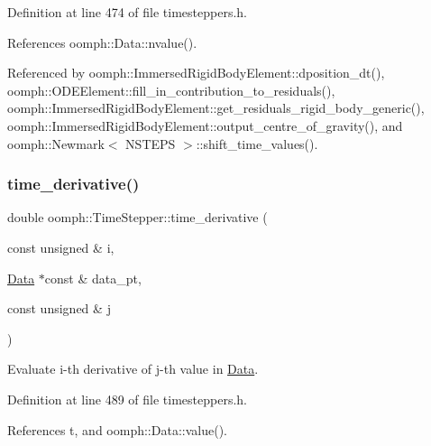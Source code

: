 Definition at line 474 of file timesteppers.\+h.



References oomph\+::\+Data\+::nvalue().



Referenced by oomph\+::\+Immersed\+Rigid\+Body\+Element\+::dposition\+\_\+dt(), oomph\+::\+O\+D\+E\+Element\+::fill\+\_\+in\+\_\+contribution\+\_\+to\+\_\+residuals(), oomph\+::\+Immersed\+Rigid\+Body\+Element\+::get\+\_\+residuals\+\_\+rigid\+\_\+body\+\_\+generic(), oomph\+::\+Immersed\+Rigid\+Body\+Element\+::output\+\_\+centre\+\_\+of\+\_\+gravity(), and oomph\+::\+Newmark$<$ N\+S\+T\+E\+P\+S $>$\+::shift\+\_\+time\+\_\+values().

\mbox{\label{classoomph_1_1TimeStepper_ab88e09cb347f024c07d7341ee6ba7389}} 
\subsubsection{\texorpdfstring{time\+\_\+derivative()}{time\_derivative()}\hspace{0.1cm}{\footnotesize\ttfamily [2/4]}}
{\footnotesize\ttfamily double oomph\+::\+Time\+Stepper\+::time\+\_\+derivative (\begin{DoxyParamCaption}\item[{const unsigned \&}]{i,  }\item[{\hyperlink{classoomph_1_1Data}{Data} $\ast$const \&}]{data\+\_\+pt,  }\item[{const unsigned \&}]{j }\end{DoxyParamCaption})\hspace{0.3cm}{\ttfamily [inline]}}



Evaluate i-\/th derivative of j-\/th value in \hyperlink{classoomph_1_1Data}{Data}. 



Definition at line 489 of file timesteppers.\+h.



References t, and oomph\+::\+Data\+::value().

\mbox{\label{classoomph_1_1TimeStepper_a3adfcfcf4ba99366d1475df8b4722082}} 
